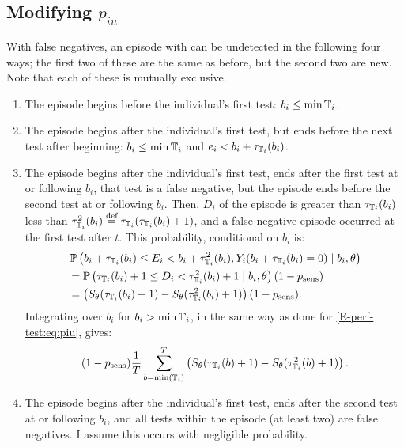 \documentclass[thesis.tex]{subfiles}
\begin{document}
\subsection{Modifying \texorpdfstring{$p_{iu}$}{piu}} \label{modifying-p_it}

With false negatives, an episode with can be undetected in the following four ways; the first two of these are the same as before, but the second two are new.
Note that each of these is mutually exclusive.
\begin{enumerate}
\item
  The episode begins before the individual's first test: $b_i \leq \min \mathbb{T}_i$.
\item
  The episode begins after the individual's first test, but ends before the next test after beginning: $b_i \leq \min \mathbb{T}_i$ and $e_i < b_i + \tau_{\mathbb{T}_i}(b_i)$.
\item
  The episode begins after the individual's first test, ends after the first test at or following $b_i$, that test is a false negative, but the episode ends before the second test at or following $b_i$.
  Then, $D_i$ of the episode is greater than $\tau_{\mathbb{T}_i}(b_i)$ less than  $\tau^2_{\mathbb{T}_i}(b_i) \stackrel{\text{def}}{=} \tau_{\mathbb{T}_i}(\tau_{\mathbb{T}_i}(b_i) + 1)$, and a false negative episode occurred at the first test after $t$.
  This probability, conditional on $b_i$ is:
  \begin{align}
    &\operatorname{\mathbb{P}} \left( b_i + \tau_{\mathbb{T}_i}(b_i) \leq E_i < b_i + \tau^2_{\mathbb{T}_i}(b_i), Y_i(b_i + \tau_{\mathbb{T}_i}(b_i) = 0) \mid b_i, \theta \right) \\
    &= \operatorname{\mathbb{P}} \left(\tau_{\mathbb{T}_i}(b_i) + 1 \leq D_i < \tau^2_{\mathbb{T}_i}(b_i) + 1 \mid b_i, \theta \right) (1 - p_\text{sens}) \\
    &= \left( S_\theta(\tau_{\mathbb{T}_i}(b_i) + 1) - S_\theta(\tau^2_{\mathbb{T}_i}(b_i) + 1) \right) (1 - p_\text{sens}).
  \end{align}
  Integrating over $b_i$ for $b_i > \min \mathbb{T}_i$, in the same way as done for \cref{E-perf-test:eq:piu}, gives:
  \begin{align}
    (1 - p_\text{sens})\frac{1}{T} \sum_{b=\min(\mathbb{T}_i)}^T \left( S_\theta(\tau_{\mathbb{T}_i}(b) + 1) - S_\theta(\tau^2_{\mathbb{T}_i}(b) + 1) \right).
  \end{align}
\item
  The episode begins after the individual's first test, ends after the second test at or following $b_i$, and all tests within the episode (at least two) are false negatives.
  I assume this occurs with negligible probability.
\end{enumerate}
\end{document}
